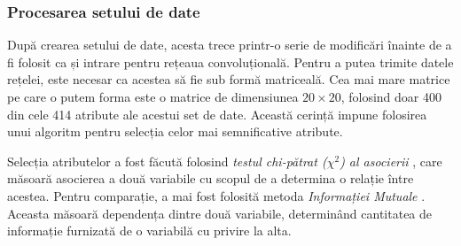 \subsubsection*{Procesarea setului de date}\label{ssch:procesare-date}
După crearea setului de date, acesta trece printr-o serie de modificări înainte de a fi folosit ca și intrare pentru rețeaua convoluțională. Pentru a putea trimite datele rețelei, este necesar ca acestea să fie sub formă matriceală. Cea mai mare matrice pe care o putem forma este o matrice de dimensiunea $20\times20$, folosind doar 400 din cele 414 atribute ale acestui set de date. Această cerință impune folosirea unui algoritm pentru selecția celor mai semnificative atribute.

Selecția atributelor a fost făcută folosind \textit{testul chi-pătrat ($\chi^2$) al asocierii} \cite{online:chi-squared-pdf}, care măsoară asocierea a două variabile cu scopul de a determina o relație între acestea. Pentru comparație, a mai fost folosită metoda \textit{Informației Mutuale} \cite{online:info-mutuala}. Aceasta măsoară dependența dintre două variabile, determinând cantitatea de informație furnizată de o variabilă cu privire la alta.

